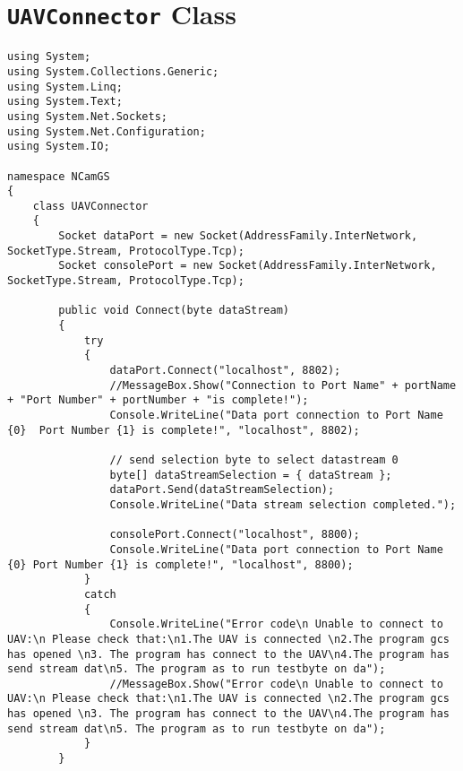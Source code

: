 
\lstset{numbers=left,
numberstyle=\footnotesize, 
stepnumber=2,numbersep=5pt}
\section{\texttt{UAVConnector} Class}
\begin{lstlisting}[caption=\texttt{UAVConnector} Class, label=appen:UAVConnector]
using System;
using System.Collections.Generic;
using System.Linq;
using System.Text;
using System.Net.Sockets;
using System.Net.Configuration;
using System.IO;

namespace NCamGS
{
    class UAVConnector
    {
        Socket dataPort = new Socket(AddressFamily.InterNetwork, SocketType.Stream, ProtocolType.Tcp);
        Socket consolePort = new Socket(AddressFamily.InterNetwork, SocketType.Stream, ProtocolType.Tcp);

        public void Connect(byte dataStream)
        {
            try
            {
                dataPort.Connect("localhost", 8802);
                //MessageBox.Show("Connection to Port Name" + portName + "Port Number" + portNumber + "is complete!");
                Console.WriteLine("Data port connection to Port Name {0}  Port Number {1} is complete!", "localhost", 8802);

                // send selection byte to select datastream 0
                byte[] dataStreamSelection = { dataStream };
                dataPort.Send(dataStreamSelection);
                Console.WriteLine("Data stream selection completed.");

                consolePort.Connect("localhost", 8800);
                Console.WriteLine("Data port connection to Port Name {0} Port Number {1} is complete!", "localhost", 8800);
            }
            catch
            {
                Console.WriteLine("Error code\n Unable to connect to UAV:\n Please check that:\n1.The UAV is connected \n2.The program gcs has opened \n3. The program has connect to the UAV\n4.The program has send stream dat\n5. The program as to run testbyte on da");
                //MessageBox.Show("Error code\n Unable to connect to UAV:\n Please check that:\n1.The UAV is connected \n2.The program gcs has opened \n3. The program has connect to the UAV\n4.The program has send stream dat\n5. The program as to run testbyte on da");
            }
        }


\end{lstlisting}
